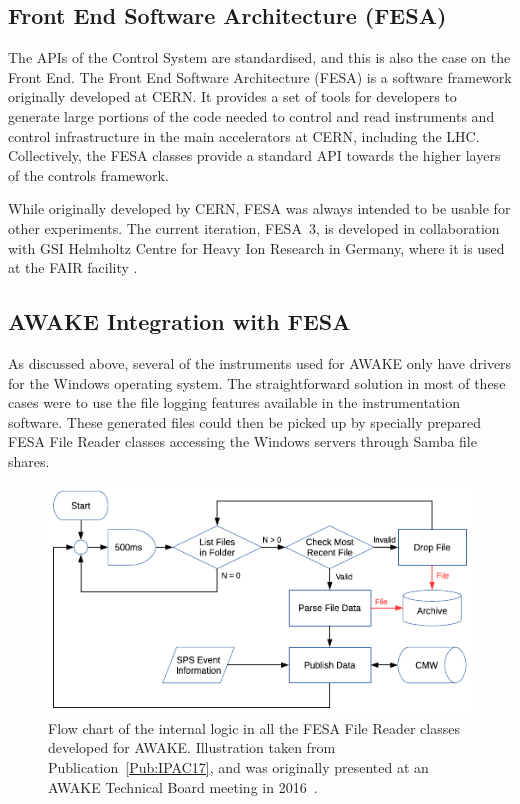 \subsection{Front End Software Architecture (FESA)}
\label{DAQ:FESA}

The APIs of the Control System are standardised, and this is also the case on the Front End.
The Front End Software Architecture (FESA) is a software framework originally developed at CERN.
It provides a set of tools for developers to generate large portions of the code needed to control and read instruments and control infrastructure in the main accelerators at CERN, including the LHC.
Collectively, the FESA classes provide a standard API towards the higher layers of the controls framework.

While originally developed by CERN, FESA was always intended to be usable for other experiments.
The current iteration, FESA~3, is developed in collaboration with GSI Helmholtz Centre for Heavy Ion Research in Germany, where it is used at the FAIR facility \cite{schwinn:2010}.

\subsection{AWAKE Integration with FESA}
\label{DAQ:Integration}

As discussed above, several of the instruments used for AWAKE only have drivers for the Windows operating system.
The straightforward solution in most of these cases were to use the file logging features available in the instrumentation software.
These generated files could then be picked up by specially prepared FESA File Reader classes accessing the Windows servers through Samba file shares.

\begin{figure}[hbt]
    \centering
    \includegraphics[width=0.85\linewidth,trim={0mm 0mm 0mm 0mm},clip]{figures/FileReader}
    \caption{\label{Fig:DAQ:Reader}
        Flow chart of the internal logic in all the FESA File Reader classes developed for AWAKE.
        Illustration taken from Publication~\ref{Pub:IPAC17}, and was originally presented at an AWAKE Technical Board meeting in 2016~\cite{add:berglyd_olsen:2016}.
    }
\end{figure}

